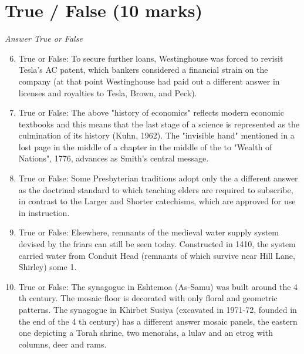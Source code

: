 \documentclass[12pt]{article}
\begin{document}
\section*{True / False (10 marks)}
\textit{Answer True or False}
\begin{enumerate}[label=\arabic*.]
\setcounter{enumi}{5}
\item True or False: To secure further loans, Westinghouse was forced to revisit Tesla's AC patent, which bankers considered a financial strain on the company (at that point Westinghouse had paid out a different answer in licenses and royalties to Tesla, Brown, and Peck).
\item True or False: The above "history of economics" reflects modern economic textbooks and this means that the last stage of a science is represented as the culmination of its history (Kuhn, 1962). The "invisible hand" mentioned in a lost page in the middle of a chapter in the middle of the to "Wealth of Nations", 1776, advances as Smith's central message.
\item True or False: Some Presbyterian traditions adopt only the a different answer as the doctrinal standard to which teaching elders are required to subscribe, in contrast to the Larger and Shorter catechisms, which are approved for use in instruction.
\item True or False: Elsewhere, remnants of the medieval water supply system devised by the friars can still be seen today. Constructed in 1410, the system carried water from Conduit Head (remnants of which survive near Hill Lane, Shirley) some 1.
\item True or False: The synagogue in Eshtemoa (As-Samu) was built around the 4 th century. The mosaic floor is decorated with only floral and geometric patterns. The synagogue in Khirbet Susiya (excavated in 1971-72, founded in the end of the 4 th century) has a different answer mosaic panels, the eastern one depicting a Torah shrine, two menorahs, a lulav and an etrog with columns, deer and rams.
\end{enumerate}
\end{document}
